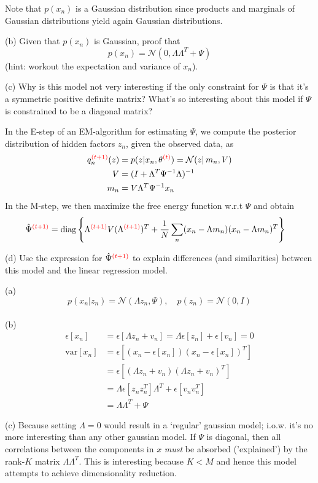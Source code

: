 \documentclass[a4paper]{article}
\newcommand{\N}{\mathcal{N}}
\newcommand{\mc}[1]{\mathcal{#1}}
\newcommand{\var}{\mathrm{var}}
\def\r#1{{\color{red}#1}}
\begin{document}
\begin{ExerciseList}
\medskip
Note that $p(x_n)$ is a Gaussian distribution since products and marginals of Gaussian distributions yield again Gaussian distributions.

(b) Given that $p(x_n)$ is Gaussian, proof that
$$p(x_n) = \mc{N}(0,\Lambda \Lambda^T +\Psi)$$
(hint: workout the expectation and variance of $x_n$).

(c) Why is this model not very interesting if the only constraint for $\Psi$ is that it's a symmetric positive definite matrix? What's so interesting about this model if $\Psi$ is constrained to be a diagonal matrix?

\medskip
In the E-step of an EM-algorithm for estimating $\Psi$, we compute the posterior distribution of hidden factors $z_n$, given the observed data, as
\begin{align*}
q_n^{\r{(t+1)}}(z) &= p(z|x_n,\theta^{\r{(t)}}) = \N(z|\,m_n,V)\\
    V &= (I + \Lambda^T \Psi^{-1} \Lambda)^{-1} \\
    m_n &= V \Lambda^T \Psi^{-1} x_n
    \end{align*}
In the M-step, we then maximize the free energy function w.r.t $\Psi$ and obtain
\begin{align*}
\hat \Psi^{\r{(t+1)}} &= \text{diag}\left\{\Lambda^{\r{(t+1)}} V (\Lambda^{\r{(t+1)}})^T + \frac{1}{N} \sum_n (x_n-\Lambda m_n)(x_n-\Lambda m_n)^T \right\}
\end{align*}

(d) Use the expression for $\hat \Psi^{\r{(t+1)}}$ to explain differences (and similarities) between this model and the linear regression model.



\Answer[ref={ex:6}]

(a) $$ p(x_n|z_n) = \mc{N}(\Lambda z_n,\Psi), \quad p(z_n)=\mc{N}(0,I)$$\\

(b) \begin{align*}
\epsilon[x_n] &= \epsilon[\Lambda z_n + v_n] = \Lambda \epsilon[z_n] + \epsilon[v_n] = 0\\
\var[x_n] &= \epsilon[(x_n-\epsilon[x_n])(x_n-\epsilon[x_n])^T]\\
    &=\epsilon[(\Lambda z_n + v_n)(\Lambda z_n + v_n)^T]\\
    &= \Lambda \epsilon[z_nz_n^T]\Lambda^T + \epsilon[v_nv_n^T]\\
    &=\Lambda\Lambda^T + \Psi
\end{align*}

(c) Because setting $\Lambda=0$ would result in a `regular' gaussian model; i.o.w. it's no more interesting than any other gaussian model. If $\Psi$ is diagonal, then all correlations between the components in $x$ \emph{must} be absorbed ('explained') by the rank-$K$ matrix $\Lambda \Lambda^T$. This is interesting because $K<M$ and hence this model attempts to achieve dimensionality reduction.\\


\end{ExerciseList}
\end{document}
